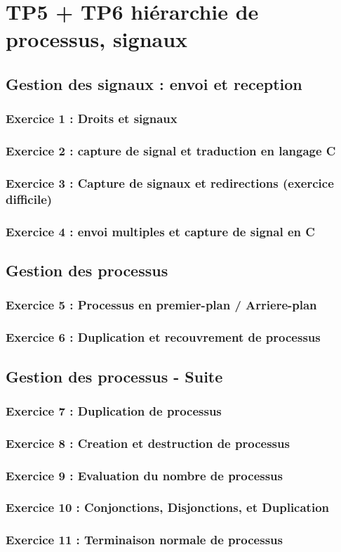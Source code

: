 \chapter{TP5 + TP6 hiérarchie de processus, signaux}
    \section{Gestion des signaux : envoi et reception}
        \subsection{Exercice 1 : Droits et signaux}
        \subsection{Exercice 2 : capture de signal et traduction en langage C}
        \subsection{Exercice 3 : Capture de signaux et redirections (exercice difficile)}
        \subsection{Exercice 4 : envoi multiples et capture de signal en C}
    \section{Gestion des processus}
        \subsection{Exercice 5 : Processus en premier-plan / Arriere-plan}
        \subsection{Exercice 6 : Duplication et recouvrement de processus}
    \section{Gestion des processus - Suite}
        \subsection{Exercice 7 : Duplication de processus}
        \subsection{Exercice 8 : Creation et destruction de processus}
        \subsection{Exercice 9 : Evaluation du nombre de processus}
        \subsection{Exercice 10 : Conjonctions, Disjonctions, et Duplication}
        \subsection{Exercice 11 : Terminaison normale de processus}
